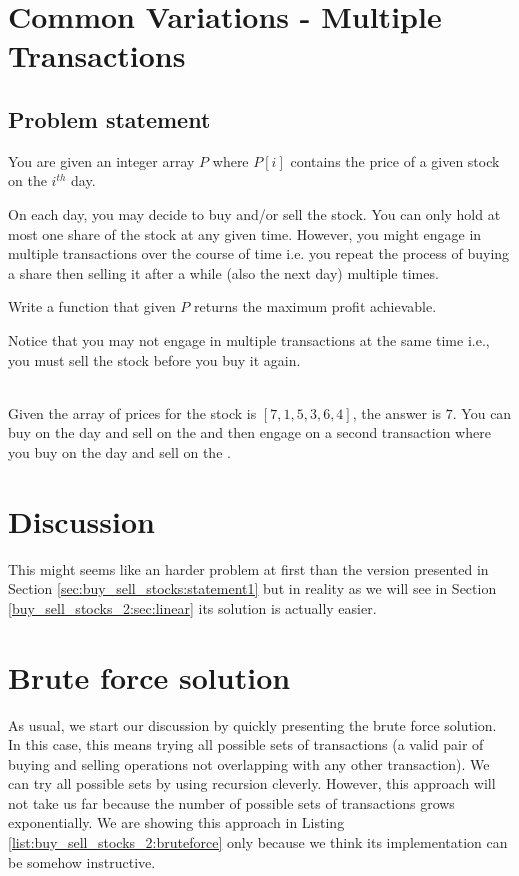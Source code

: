 \section{Common Variations - Multiple Transactions}
\label{sec:buy_sell_stocks:multiple_transaction}

\subsection{Problem statement}
\begin{exercise}
    You are given an integer array $P$ where $P[i]$ contains the price of a given stock on the $i^{th}$ day.

    On each day, you may decide to buy and/or sell the stock. 
    You can only hold at most one share of the stock at any given time.
    However, you might engage in multiple transactions over the course of time i.e. you repeat the process of buying a share then selling it after a while (also the next day) multiple times.
    
    Write a function that given $P$ returns the maximum profit achievable.

    Notice that you may not engage in multiple transactions at the same time i.e., you must sell the stock before you buy it again.
    \begin{example}
    \label{ex:buy_sell_stocks_2:exmaple1}
        \hfill \\
        Given the array of prices for the stock is $[7,1,5,3,6,4]$, the answer is $7$. 
        You can buy on the  day and sell on the  and then engage on a second transaction where you buy on the  day and sell on the .
    \end{example}

\end{exercise}


\section{Discussion}
\label{buy_sell_stocks_2:sec:discussion}
This might seems like an harder problem at first than the version presented in Section \ref{sec:buy_sell_stocks:statement1} but in reality as we will see in Section \ref{buy_sell_stocks_2:sec:linear} its solution is actually easier.

\section{Brute force solution}
\label{buy_sell_stocks_2:sec:bruteforce}
As usual, we start our discussion by quickly presenting the brute force solution. In this case, this means trying all possible sets of transactions (a valid pair of buying and selling operations not overlapping with any other transaction). We can try all possible sets by using recursion cleverly. However, this approach will not take us far because the number of possible sets of transactions grows exponentially.
We are showing this approach in Listing \ref{list:buy_sell_stocks_2:bruteforce}  only because we think its implementation can be somehow instructive.

